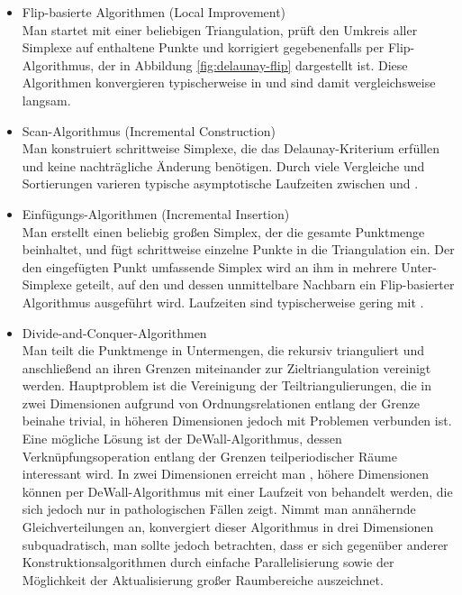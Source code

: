 \begin{itemize}
\item Flip-basierte Algorithmen (Local Improvement)\\
  Man startet mit einer beliebigen Triangulation, prüft den Umkreis aller Simplexe auf enthaltene Punkte und korrigiert gegebenenfalls per Flip-Algorithmus, der in Abbildung \ref{fig:delaunay-flip} dargestellt ist.
  Diese Algorithmen konvergieren typischerweise in  und sind damit vergleichsweise langsam.

\item Scan-Algorithmus (Incremental Construction)\\
  Man konstruiert schrittweise Simplexe, die das Delaunay-Kriterium erfüllen und keine nachträgliche Änderung benötigen.
  Durch viele Vergleiche und Sortierungen varieren typische asymptotische Laufzeiten zwischen  und .

\item Einfügungs-Algorithmen (Incremental Insertion)\\
  Man erstellt einen beliebig großen Simplex, der die gesamte Punktmenge beinhaltet, und fügt schrittweise einzelne Punkte in die Triangulation ein.
  Der den eingefügten Punkt umfassende Simplex wird an ihm in mehrere Unter-Simplexe geteilt, auf den und dessen unmittelbare Nachbarn ein Flip-basierter Algorithmus ausgeführt wird.
  Laufzeiten sind typischerweise gering mit .

\item Divide-and-Conquer-Algorithmen\\
  Man teilt die Punktmenge in Untermengen, die rekursiv trianguliert und anschließend an ihren Grenzen miteinander zur Zieltriangulation vereinigt werden.
  Hauptproblem ist die Vereinigung der Teiltriangulierungen, die in zwei Dimensionen aufgrund von Ordnungsrelationen entlang der Grenze beinahe trivial, in höheren Dimensionen jedoch mit Problemen verbunden ist.
  Eine mögliche Lösung ist der DeWall-Algorithmus\cite{cignoni_dewall:_1998}, dessen Verknüpfungsoperation entlang der Grenzen teilperiodischer Räume interessant wird.
  In zwei Dimensionen erreicht man , höhere Dimensionen können per DeWall-Algorithmus mit einer Laufzeit von  behandelt werden, die sich jedoch nur in pathologischen Fällen zeigt.
  Nimmt man annähernde Gleichverteilungen an, konvergiert dieser Algorithmus in drei Dimensionen subquadratisch, man sollte jedoch betrachten, dass er sich gegenüber anderer Konstruktionsalgorithmen durch einfache Parallelisierung sowie der Möglichkeit der Aktualisierung großer Raumbereiche auszeichnet.


\end{itemize}

